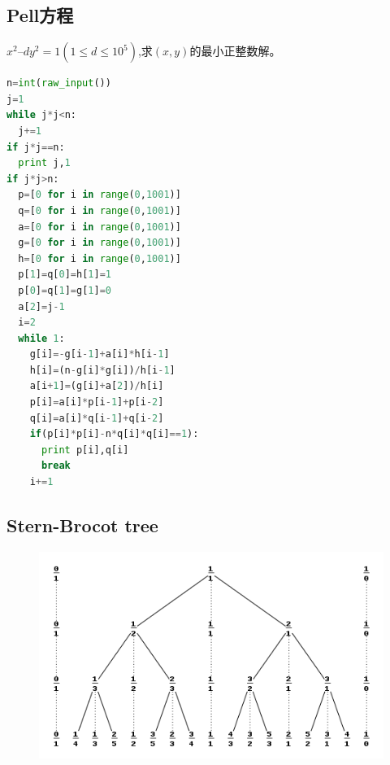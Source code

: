 \documentclass[UTF8,a4paper,titlepage]{ctexart}
\begin{document}
        \subsection{Pell方程}
$x^2–dy^2=1(1\leq d\leq10^5)$,求$(x,y)$的最小正整数解。
\begin{lstlisting}[language=python]
n=int(raw_input())
j=1
while j*j<n:
  j+=1
if j*j==n:
  print j,1
if j*j>n:
  p=[0 for i in range(0,1001)]
  q=[0 for i in range(0,1001)]
  a=[0 for i in range(0,1001)]
  g=[0 for i in range(0,1001)]
  h=[0 for i in range(0,1001)]
  p[1]=q[0]=h[1]=1
  p[0]=q[1]=g[1]=0
  a[2]=j-1
  i=2
  while 1:
    g[i]=-g[i-1]+a[i]*h[i-1]
    h[i]=(n-g[i]*g[i])/h[i-1]
    a[i+1]=(g[i]+a[2])/h[i]
    p[i]=a[i]*p[i-1]+p[i-2]
    q[i]=a[i]*q[i-1]+q[i-2]
    if(p[i]*p[i]-n*q[i]*q[i]==1):
      print p[i],q[i]
      break
    i+=1
\end{lstlisting}
\subsection{Stern-Brocot tree}
\begin{figure}[h!]
\centering
\includegraphics[scale=0.8]{sbtree.png}
\label{fig:SBtree}
\end{figure}
\end{document}
